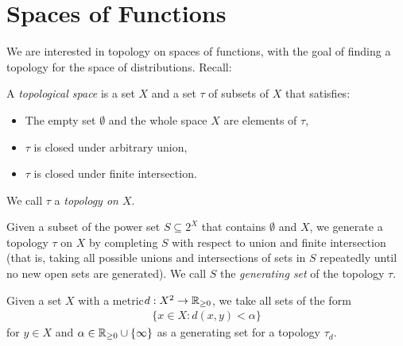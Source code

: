     \section{Spaces of Functions}
      \label{sec:spcoffunc}
      We are interested in topology on spaces of functions, with the goal of finding a topology for the space of distributions.
      Recall:
      \begin{defn}
        A \emph{topological space} is a set $X$ and a set $\tau$ of subsets of $X$ that satisfies:
        \begin{itemize}
          \item The empty set $\emptyset$ and the whole space $X$ are elements of $\tau$,
          \item $\tau$ is closed under arbitrary union,
          \item $\tau$ is closed under finite intersection.
        \end{itemize}
        We call $\tau$ a \emph{topology on $X$}.

        Given a subset of the power set $S\subseteq2^X$ that contains $\emptyset$ and $X$, we generate a topology $\tau$ on $X$ by completing $S$ with respect to union and finite intersection (that is, taking all possible unions and intersections of sets in $S$ repeatedly until no new open sets are generated).
        We call $S$ the \emph{generating set} of the topology $\tau$.

        Given a set $X$ with a metric\footnotemark $d:X^2\rightarrow\mathbb{R}_{\ge 0}$, we take all sets of the form 
        \begin{align*}
          \{x\in X:d(x,y)<\alpha\}
        \end{align*}
        for $y\in X$ and $\alpha\in\mathbb{R}_{\ge0}\cup\{\infty\}$ as a generating set for a topology $\tau_d$.
      \end{defn}

